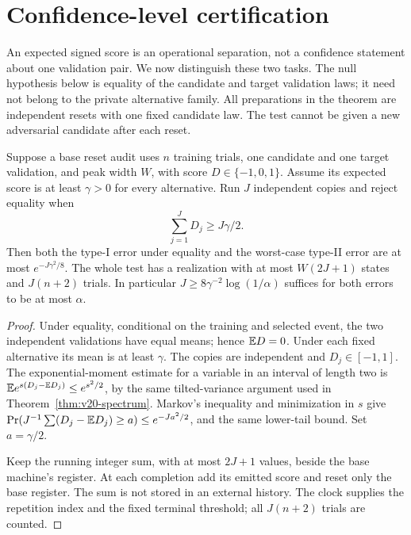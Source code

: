 \section{Confidence-level certification}
\label{sec:v21-confidence}
An expected signed score is an operational separation, not a confidence
statement about one validation pair. We now distinguish these two tasks.
The null hypothesis below is equality of the candidate and target
validation laws; it need not belong to the private alternative family.
All preparations in the theorem are independent resets with one fixed
candidate law. The test cannot be given a new adversarial candidate after
each reset.

\begin{theorem}
\label{thm:v21-confidence}
Suppose a base reset audit uses $n$ training trials, one candidate and
one target validation, and peak width $W$, with score $D\in\{-1,0,1\}$.
Assume its expected score is at least $\gamma>0$ for every alternative.
Run $J$ independent copies and reject equality when
\begin{equation}\label{eq:v21-test}
 \sum_{j=1}^J D_j\ge J\gamma/2.
\end{equation}
Then both the type-I error under equality and the worst-case type-II
error are at most $e^{-J\gamma^2/8}$. The whole test has a realization
with at most $W(2J+1)$ states and $J(n+2)$ trials. In particular
$J\ge8\gamma^{-2}\log(1/\alpha)$ suffices for both errors to be at
most $\alpha$.
\end{theorem}
\begin{proof}
Under equality, conditional on the training and selected event, the two
independent validations have equal means; hence $\mathbb E D=0$. Under each
fixed alternative its mean is at least $\gamma$. The copies are
independent and $D_j\in[-1,1]$. The exponential-moment estimate for a
variable in an interval of length two is
$\mathbb E e^{s(D_j-\mathbb E D_j)}\le e^{s^2/2}$, by the same tilted-variance
argument used in Theorem~\ref{thm:v20-spectrum}. Markov's inequality
and minimization in $s$ give
$\Pr(J^{-1}\sum(D_j-\mathbb E D_j)\ge a)\le e^{-Ja^2/2}$, and the same
lower-tail bound. Set $a=\gamma/2$.

Keep the running integer sum, with at most $2J+1$ values, beside the
base machine's register. At each completion add its emitted score and
reset only the base register. The sum is not stored in an external
history. The clock supplies the repetition index and the fixed terminal
threshold; all $J(n+2)$ trials are counted.
\end{proof}


